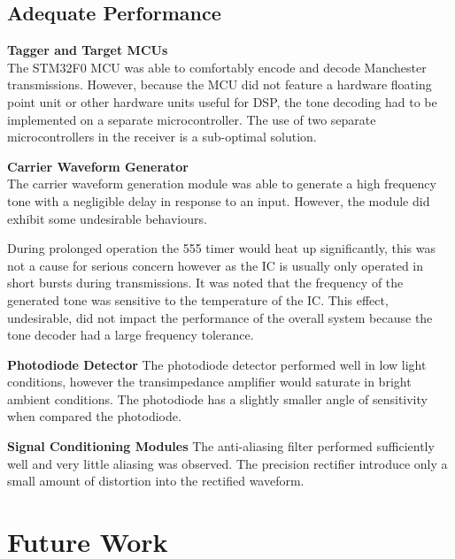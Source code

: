 \subsection{Adequate Performance}

\textbf{Tagger and Target MCUs}\\
The STM32F0 MCU was able to comfortably encode and decode Manchester transmissions. However, because the MCU did not feature a hardware floating point unit or other hardware units useful for DSP, the tone decoding had to be implemented on a separate microcontroller. The use of two separate microcontrollers in the receiver is a sub-optimal solution.


\textbf{Carrier Waveform Generator}\\
The carrier waveform generation module was able to generate a high frequency tone with a negligible delay in response to an input. However, the module did exhibit some undesirable behaviours.

During prolonged operation the 555 timer would heat up significantly, this was not a cause for serious concern however as the IC is usually only operated in short bursts during transmissions. It was noted that the frequency of the generated tone was sensitive to the temperature of the IC. This effect, undesirable, did not impact the performance of the overall system because the tone decoder had a large frequency tolerance. 

\textbf{Photodiode Detector}
The photodiode detector performed well in low light conditions, however the transimpedance amplifier would saturate in bright ambient conditions. The photodiode has a slightly smaller angle of sensitivity when compared the photodiode.

\textbf{Signal Conditioning Modules}
The anti-aliasing filter performed sufficiently well and very little aliasing was observed. The precision rectifier introduce only a small amount of distortion into the rectified waveform.


\section{Future Work}

